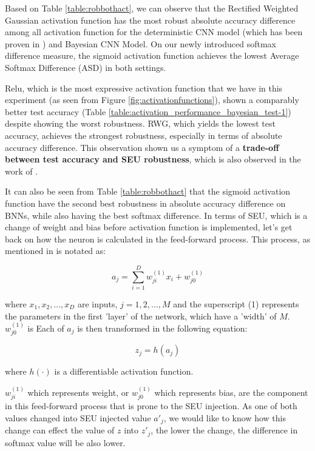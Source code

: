 \documentclass[ %
                    author={Revalda Putawara},
                supervisor={Dr. James Pope},
                    degree={MSc},
                     title={Robustness of Bayesian Neural Networks Design Choices Against Weight and Bias Perturbation Induced by Single Event Upsets (SEUs)},
                      type={},
                      year={2025}]{dissertation}
\begin{document}
Based on Table \ref{table:robbothact}, we can observe that the Rectified Weighted Gaussian activation function has the most robust absolute accuracy difference among all activation function for the deterministic CNN model (which has been proven in \cite{dennispoperobustcnn}) and Bayesian CNN Model. On our newly introduced softmax difference measure, the sigmoid activation function achieves the lowest Average Softmax Difference (ASD) in both settings.


Relu, which is the most expressive activation function that we have in this experiment (as seen from Figure \ref{fig:activationfunctions}), shown a comparably better test accuracy (Table  \ref{table:activation_performance_bayesian_test-1}) despite showing the worst robustness. RWG, which yields the lowest test accuracy, achieves the strongest robustness, especially in terms of absolute accuracy difference. This observation shown us a symptom of a \textbf{trade-off between test accuracy and SEU robustness}, which is also observed in the work of \cite{carbone2020a}.

It can also be seen from Table \ref{table:robbothact} that the sigmoid activation function have the second best robustness in absolute accuracy difference on BNNs, while also having the best softmax difference. In terms of SEU, which is a change of weight and bias before activation function is implemented, let's get back on how the neuron is calculated in the feed-forward process. This process, as mentioned in \cite{bishoppatternrecognition2007} is notated as:

\begin{equation}
\label{eq:neuronfeedforward}
a_j = \sum_{i=1}^{D} w^{(1)}_{ji} x_i + w^{(1)}_{j0}
\end{equation}

where $x_1,x_2,\dots,x_D$ are inputs, $j=1,2,\dots,M$ and the superscript (1) represents the parameters in the first 'layer' of the network, which have a 'width' of $M$. $w^{(1)}_{j0}$ is  Each of $a_j$ is then transformed in the following equation:

\begin{equation}
z_j = h(a_j)
\end{equation}

where $h(\cdot)$ is a differentiable activation function.

$w^{(1)}_{ji}$ which represents weight, or $w^{(1)}_{j0}$ which represents bias, are the component in this feed-forward process that is prone to the SEU injection. As one of both values changed into SEU injected value $a'_j$, we would like to know how this change can effect the value of $z$ into $z'_j$, the lower the change, the difference in softmax value will be also lower.
\end{document}
